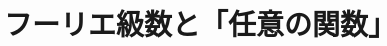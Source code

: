\documentclass[../book_why-set-theory-why-topology]{subfiles}
\begin{document}
\section{フーリエ級数と「任意の関数」}
\end{document}
